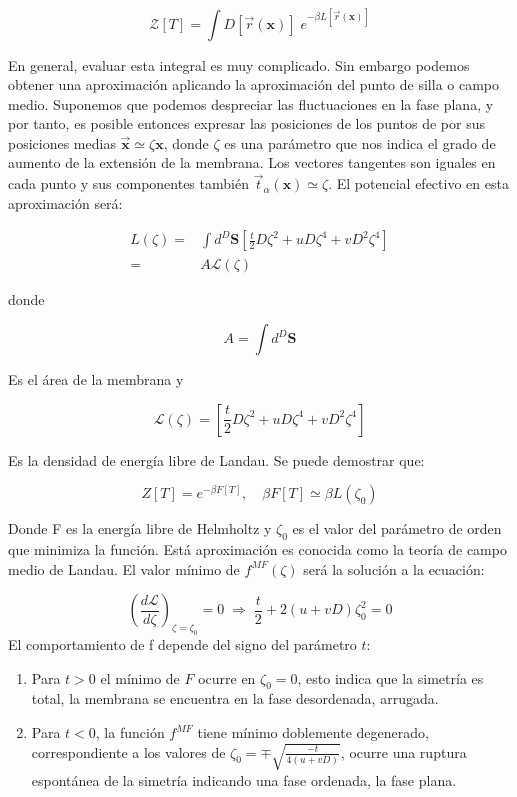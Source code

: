 \begin{equation}
\mathcal{Z}[T]=\int D[\vec{r}(\mathbf{x})]\; e^{-\beta L[\vec{r}(\mathbf{x})]}
\end{equation}

En general, evaluar esta integral es muy complicado. Sin embargo podemos
obtener una aproximación aplicando la aproximación del punto de silla o campo
medio. Suponemos que podemos despreciar las fluctuaciones en la fase plana, y
por tanto, es posible entonces expresar las posiciones de los puntos de por
sus posiciones medias $\vec{\mathbf{x}}\simeq \zeta \mathbf{x}$, donde $\zeta$
es una parámetro que nos indica el grado de aumento de la extensión de la
membrana. Los vectores tangentes son iguales en cada punto y sus componentes también
$\vec{t}_{\alpha}(\mathbf{x})\simeq\zeta$. El potencial efectivo en esta
aproximación será:

\begin{align}
  L(\zeta)=&\int d^D \mathbf{S} \left[ \frac{t}{2} D\zeta^2 + uD\zeta^4+vD^2\zeta^4\right]\\
  =&A\mathcal{L}(\zeta)
\end{align}

donde 

$$A=\int d^D \mathbf{S}$$

Es el área de la membrana y 

\begin{equation}
\mathcal{L}(\zeta)=\left[ \frac{t}{2} D\zeta^2 + uD\zeta^4+vD^2\zeta^4\right]
\end{equation}

Es la densidad de energía libre de Landau. Se puede demostrar que:

\begin{equation}
Z[T]= e^{-\beta F[T]}, \quad \beta F[T]\simeq \beta L(\zeta_0)
\end{equation}

Donde F es la energía libre de Helmholtz  y $\zeta_0$ es el valor del
parámetro de orden que minimiza la función. Está aproximación es conocida
como la teoría de campo medio de Landau. El valor mínimo de $f^{MF}(\zeta)$
será la solución a la ecuación:

\begin{equation}
\left(\frac{d\mathcal{L}}{d\zeta}\right)_{\!\zeta=\zeta_0}\!=0 \; \Rightarrow \; \frac{t}{2}+2(u+vD)\zeta_0^2=0
\end{equation}
 El comportamiento de f depende del signo del parámetro $t$:

\begin{enumerate}
\item Para $t>0$ el mínimo de $F$ ocurre en $\zeta_0=0$, esto indica que la
  simetría es total, la membrana se encuentra en la fase desordenada,
  arrugada.
\item Para $t<0$, la función $f^{MF}$ tiene mínimo doblemente
  degenerado, correspondiente a los valores de $\zeta_0=\mp
  \sqrt{\frac{-t}{4(u+vD)}}$, ocurre una ruptura espontánea de la simetría indicando
  una fase ordenada, la fase plana.
\end{enumerate}


